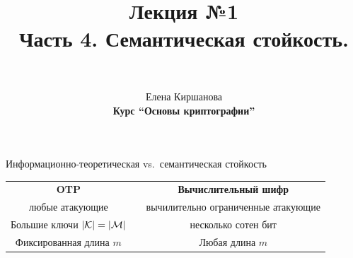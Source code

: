 \documentclass[usenames,dvipsnames,8pt,aspectratio=169]{beamer}
\author{\\ [10pt]
}
\title{Лекция №1 \\[10pt]
		Часть 4. Семантическая стойкость. }
\date{ Елена Киршанова \\  \textbf{Курс ``Основы криптографии''} \\  }
\begin{document}
	
\begin{frame}
	\titlepage
\end{frame}

\begin{frame}{Информационно-теоретическая vs.\ семантическая стойкость}
\LARGE

\begin{table}

\begin{tabular}{c p{0.6cm} c}
	\textbf{\color{Orange}OTP}  &  & \textbf{\color{Orange} Вычислительный шифр} \\[10pt]

	 {\color{Orange}любые } атакующие &  &  {\color{Orange}вычилительно ограниченные } атакующие \\[10pt]
	 
	 Большие ключи $|\mathcal{K}| = |\mathcal{M}|$ &  & несколько сотен бит \\[10pt]
	 
	 Фиксированная длина $m$  &  &Любая длина $m$
	
\end{tabular}
\end{table}

\end{frame}
\end{document}
